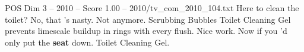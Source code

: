 \begin{textsample}{POS Dim 3 – 2010 – Score 1.00 – 2010/tv\_com\_2010\_104.txt}  \label{ex:f3_pos_049}
Here to clean the toilet?
No, that 's nasty.
Not anymore.
Scrubbing Bubbles Toilet Cleaning Gel prevents limescale buildup in rings with every flush.
Nice work.
Now if you 'd only put the \textbf{seat} down.
Toilet Cleaning Gel.

\end{textsample}
